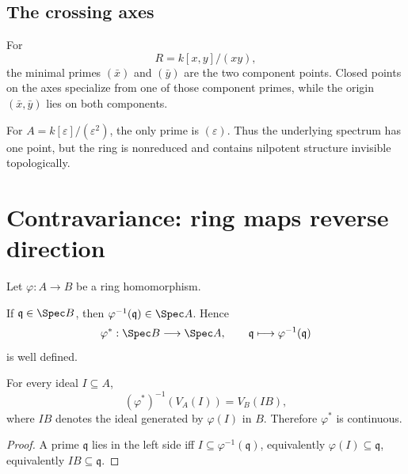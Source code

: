 

\subsection{The crossing axes}
For
\[
R=k[x,y]/(xy),
\]
the minimal primes $(\bar x)$ and $(\bar y)$ are the two component points.  Closed points
on the axes specialize from one of those component primes, while the origin
$(\bar x,\bar y)$ lies on both components.



\begin{example}\label{ex:vi07-expand-03}
For $A=k[\varepsilon]/(\varepsilon^2)$, the only prime is $(\varepsilon)$.  Thus the underlying spectrum has one point, but the ring is nonreduced and contains nilpotent structure invisible topologically.
\end{example}
\section{Contravariance: ring maps reverse direction}

Let $\varphi:A\to B$ be a ring homomorphism.

\begin{proposition}
If $\mathfrak q\in\Spec B$, then $\varphi^{-1}(\mathfrak q)\in\Spec A$.
Hence
\[
\varphi^\ast:\Spec B\longrightarrow\Spec A,
\qquad
\mathfrak q\longmapsto\varphi^{-1}(\mathfrak q)
\]
is well defined.
\end{proposition}

\begin{theorem}
For every ideal $I\subseteq A$,
\[
(\varphi^\ast)^{-1}(V_A(I))=V_B(IB),
\]
where $IB$ denotes the ideal generated by $\varphi(I)$ in $B$.  Therefore
$\varphi^\ast$ is continuous.
\end{theorem}

\begin{proof}
A prime $\mathfrak q$ lies in the left side iff
$I\subseteq\varphi^{-1}(\mathfrak q)$, equivalently $\varphi(I)\subseteq\mathfrak q$,
equivalently $IB\subseteq\mathfrak q$.
\end{proof}



